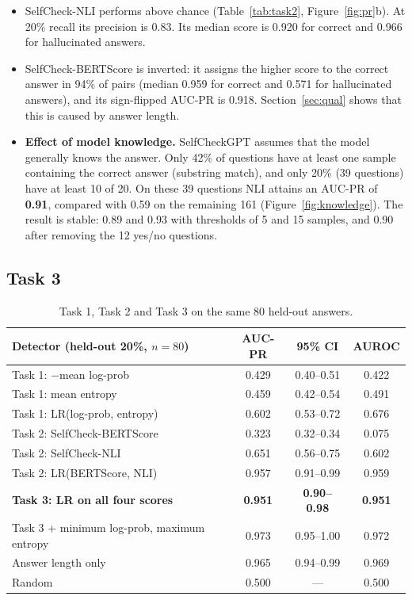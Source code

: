 \documentclass[11pt,a4paper]{article}
\begin{document}
\begin{itemize}
  \item SelfCheck-NLI performs above chance (Table~\ref{tab:task2},
        Figure~\ref{fig:pr}b). At 20\% recall its precision is 0.83. Its median score is 0.920
        for correct and 0.966 for hallucinated answers.
  \item SelfCheck-BERTScore is inverted: it assigns the higher score to the correct answer in 94\%
        of pairs (median 0.959 for correct and 0.571 for hallucinated answers), and its
        sign-flipped AUC-PR is 0.918. Section~\ref{sec:qual} shows that this is
        caused by answer length.
  \item \textbf{Effect of model knowledge.} SelfCheckGPT assumes that the model generally knows the
        answer. Only 42\% of questions have at least one sample containing the correct answer
        (substring match), and only 20\% (39 questions) have at least 10 of 20. On these 39
        questions NLI attains an AUC-PR of \textbf{0.91}, compared with 0.59 on the remaining 161
        (Figure~\ref{fig:knowledge}). The result is stable: 0.89 and 0.93 with thresholds of 5 and
        15 samples, and 0.90 after removing the 12 yes/no questions.
\end{itemize}

\subsection{Task 3}

\begin{table}[tb]
\centering\small
\begin{tabular}{lccc}
\toprule
Detector (held-out 20\%, $n=80$) & AUC-PR & 95\% CI & AUROC \\
\midrule
Task 1: $-$mean log-prob             & 0.429 & 0.40--0.51 & 0.422 \\
Task 1: mean entropy                 & 0.459 & 0.42--0.54 & 0.491 \\
Task 1: LR(log-prob, entropy)        & 0.602 & 0.53--0.72 & 0.676 \\
\midrule
Task 2: SelfCheck-BERTScore          & 0.323 & 0.32--0.34 & 0.075 \\
Task 2: SelfCheck-NLI                & 0.651 & 0.56--0.75 & 0.602 \\
Task 2: LR(BERTScore, NLI)           & 0.957 & 0.91--0.99 & 0.959 \\
\midrule
\textbf{Task 3: LR on all four scores} & \textbf{0.951} & \textbf{0.90--0.98} & \textbf{0.951} \\
Task 3 + minimum log-prob, maximum entropy & 0.973 & 0.95--1.00 & 0.972 \\
\midrule
Answer length only                   & 0.965 & 0.94--0.99 & 0.969 \\
Random                               & 0.500 & ---        & 0.500 \\
\bottomrule
\end{tabular}
\caption{Task 1, Task 2 and Task 3 on the same 80 held-out answers.}
\label{tab:task3}
\end{table}
\end{document}
